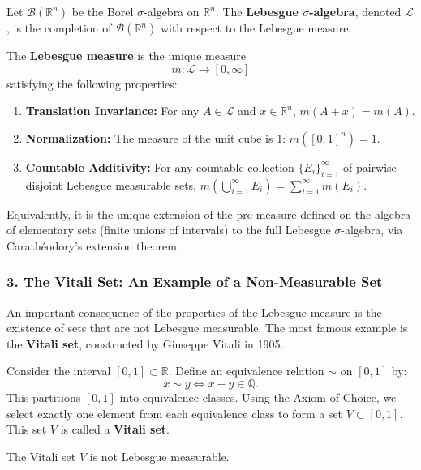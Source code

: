 \begin{definition}
Let \( \mathcal{B}(\mathbb{R}^n) \) be the Borel \(\sigma\)-algebra on \( \mathbb{R}^n \). The \textbf{Lebesgue \(\sigma\)-algebra}, denoted \( \mathcal{L} \), is the completion of \( \mathcal{B}(\mathbb{R}^n) \) with respect to the Lebesgue measure.

The \textbf{Lebesgue measure} is the unique measure
\[
m : \mathcal{L} \to [0, \infty]
\]
satisfying the following properties:
\begin{enumerate}
    \item \textbf{Translation Invariance:} For any \( A \in \mathcal{L} \) and \( x \in \mathbb{R}^n \), \( m(A + x) = m(A) \).
    \item \textbf{Normalization:} The measure of the unit cube is 1: \( m([0,1]^n) = 1 \).
    \item \textbf{Countable Additivity:} For any countable collection \( \{E_i\}_{i=1}^\infty \) of pairwise disjoint Lebesgue measurable sets, \( m\left( \bigcup_{i=1}^\infty E_i \right) = \sum_{i=1}^\infty m(E_i) \).
\end{enumerate}
Equivalently, it is the unique extension of the pre-measure defined on the algebra of elementary sets (finite unions of intervals) to the full Lebesgue \(\sigma\)-algebra, via Carathéodory's extension theorem.
\end{definition}

\subsubsection*{3. The Vitali Set: An Example of a Non-Measurable Set}

An important consequence of the properties of the Lebesgue measure is the existence of sets that are not Lebesgue measurable. The most famous example is the \textbf{Vitali set}, constructed by Giuseppe Vitali in 1905.

\begin{definition}
Consider the interval \([0,1] \subset \mathbb{R}\). Define an equivalence relation \(\sim\) on \([0,1]\) by:
\[
x \sim y \iff x - y \in \mathbb{Q}.
\]
This partitions \([0,1]\) into equivalence classes. Using the Axiom of Choice, we select exactly one element from each equivalence class to form a set \( V \subset [0,1] \). This set \( V \) is called a \textbf{Vitali set}.
\end{definition}

\begin{theorem}
The Vitali set \( V \) is not Lebesgue measurable.
\end{theorem}

